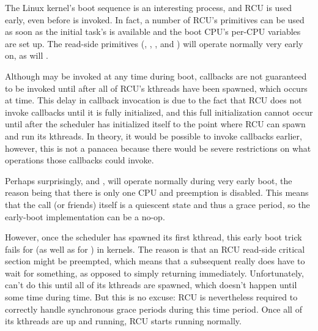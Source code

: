 The Linux kernel's boot sequence is an interesting process, and RCU is
used early, even before  is invoked.
In fact, a number of
RCU's primitives can be used as soon as the initial task's
 is available and the boot CPU's per-CPU variables are
set up.
The read-side primitives (,
, , and
) will operate normally very early on, as will
.

Although  may be invoked at any time during boot,
callbacks are not guaranteed to be invoked until after all of RCU's
kthreads have been spawned, which occurs at  time.
This delay in callback invocation is due to the fact that RCU does not
invoke callbacks until it is fully initialized, and this full
initialization cannot occur until after the scheduler has initialized
itself to the point where RCU can spawn and run its kthreads.
In theory,
it would be possible to invoke callbacks earlier, however, this is not a
panacea because there would be severe restrictions on what operations
those callbacks could invoke.

Perhaps surprisingly,  and
, will operate normally during very early
boot, the reason being that there is only one CPU and preemption is
disabled.
This means that the call  (or friends)
itself is a quiescent state and thus a grace period, so the early-boot
implementation can be a no-op.

However, once the scheduler has spawned its first kthread, this early
boot trick fails for  (as well as for
) in  kernels.
The
reason is that an RCU read-side critical section might be preempted,
which means that a subsequent  really does have to
wait for something, as opposed to simply returning immediately.
Unfortunately,  can't do this until all of its
kthreads are spawned, which doesn't happen until some time during
 time. But this is no excuse:
RCU is nevertheless
required to correctly handle synchronous grace periods during this time
period.
Once all of its kthreads are up and running, RCU starts running
normally.

